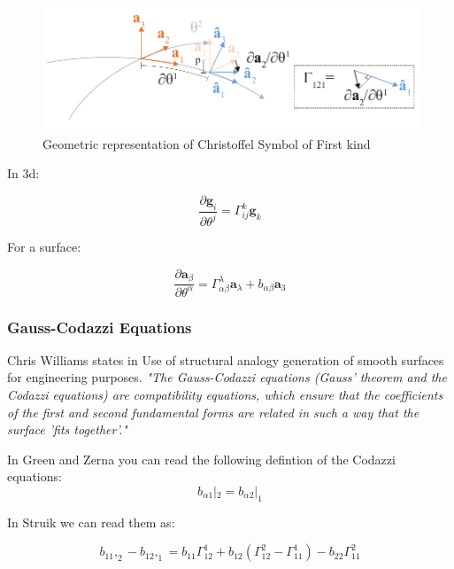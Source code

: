 \begin{figure}[H]
\centering
\includegraphics[width=0.9\linewidth ]{figure/Theory/christoffelFirstKind.pdf}
\caption{Geometric representation of Christoffel Symbol of First kind }
\end{figure}

In 3d:

\begin{equation}
 \frac{\partial\textbf{g}_i}{\partial\theta^j} = \Gamma^k_{i j} \textbf{g}_k 
\end{equation}

For a surface:

\begin{equation}
    \frac{\partial\textbf{a}_\beta}{\partial\theta^\alpha} = \Gamma^\lambda_{\alpha \beta} \textbf{a}_\lambda + b_{\alpha \beta}\textbf{a}_3
\end{equation}



\subsubsection{Gauss-Codazzi Equations}

Chris Williams states in Use of structural analogy
generation of smooth
surfaces for engineering
purposes. \textit{ "The Gauss-Codazzi equations (Gauss' theorem and the
Codazzi equations) are compatibility equations, which
ensure that the coefficients of the first and second fundamental
forms are related in such a way that the surface
'fits together'."} 




In Green and Zerna you can read the following defintion of the Codazzi
equations:
\begin{equation}
    b_{\alpha 1}|_2 = b_{\alpha 2}|_1 
\end{equation}

In Struik we can read them as:

\begin{equation}
   b_{11},_2 - b_{12},_1 = b_{11} \Gamma^1_{12} + b_{12}(\Gamma^2_{12} - \Gamma^1_{11}) - b_{22}\Gamma^2_{11} 
\end{equation}

